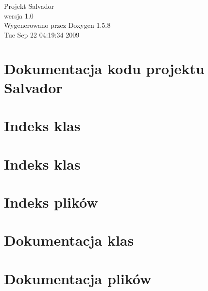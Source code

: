 \documentclass[a4paper]{book}
\begin{document}
\begin{titlepage}
\vspace*{7cm}
\begin{center}
{\Large Projekt Salvador \\[1ex]\large wersja 1.0 }\\
\vspace*{1cm}
{\large Wygenerowano przez Doxygen 1.5.8}\\
\vspace*{0.5cm}
{\small Tue Sep 22 04:19:34 2009}\\
\end{center}
\end{titlepage}
\clearemptydoublepage
{}
\tableofcontents
\clearemptydoublepage
{}
\chapter{Dokumentacja kodu projektu Salvador}
\label{index}\hypertarget{index}{}
\chapter{Indeks klas}

\chapter{Indeks klas}

\chapter{Indeks plików}

\chapter{Dokumentacja klas}










\chapter{Dokumentacja plików}























\printindex
\end{document}
